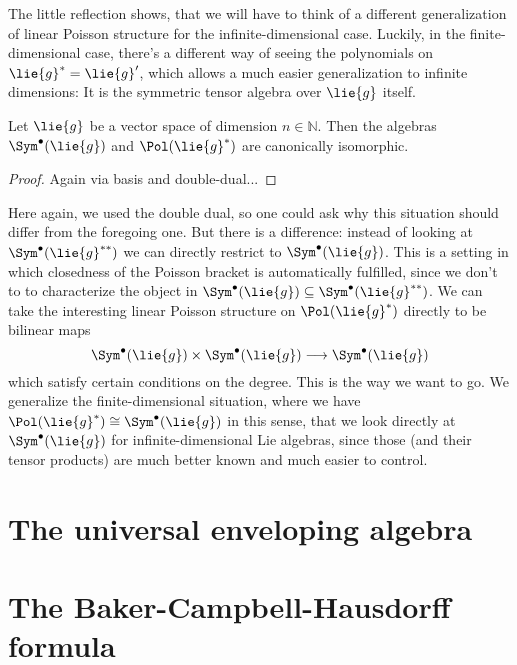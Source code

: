 The little reflection shows, that we will have to think of a different 
generalization of linear Poisson structure for the infinite-dimensional case.
Luckily, in the finite-dimensional case, there's a different way of seeing the 
polynomials on $\lie{g}^* = \lie{g}'$, which allows a much easier 
generalization to infinite dimensions: It is the symmetric tensor algebra over 
$\lie{g}$ itself.
\begin{proposition}
	\label{Prop:Alg:PolIsSym}
	Let $\lie{g}$ be a vector space of dimension $n \in \mathbb{N}$. Then 
	the algebras $\Sym^{\bullet}(\lie{g})$ and $\Pol(\lie{g}^*)$ are 
	canonically isomorphic.
\end{proposition}
\begin{proof}
	Again via basis and double-dual...
\end{proof}
Here again, we used the double dual, so one could ask why this situation 
should differ from the foregoing one. But there is a difference: instead of 
looking at $\Sym^{\bullet}(\lie{g}^{**})$ we can directly restrict to 
$\Sym^{\bullet}(\lie{g})$. This is a setting in which closedness of the 
Poisson bracket is automatically fulfilled, since we don't to to characterize 
the object in $\Sym^{\bullet}(\lie{g}) \subseteq \Sym^{\bullet}
(\lie{g}^{**})$. We can take the interesting linear Poisson structure on 
$\Pol(\lie{g}^*)$ directly to be bilinear maps
\begin{equation*}
	\Sym^{\bullet}(\lie{g})
	\times
	\Sym^{\bullet}(\lie{g})
	\longrightarrow
	\Sym^{\bullet}(\lie{g})
\end{equation*}
which satisfy certain conditions on the degree. This is the way we want to go. 
We generalize the finite-dimensional situation, where we have $\Pol(\lie{g}^*) 
\cong \Sym^{\bullet}(\lie{g})$ in this sense, that we look directly at 
$\Sym^{\bullet}(\lie{g})$ for infinite-dimensional Lie algebras, since those 
(and their tensor products) are much better known and much easier to control.



\section{The universal enveloping algebra}
\label{sec:chap3_UniversalEnveloping}


\section{The Baker-Campbell-Hausdorff formula}
\label{sec:chap3_BCH}
